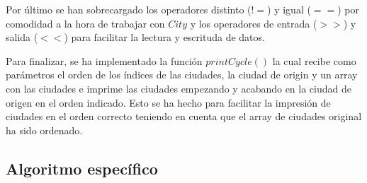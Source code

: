 \documentclass{article}
\begin{document}
Por último se han sobrecargado los operadores distinto ($!=$) y igual ($==$) por comodidad a la hora de trabajar con $City$ y los operadores de entrada ($>>$) y salida ($<<$) para facilitar la lectura y escrituda de datos.



Para finalizar, se ha implementado la función $printCycle()$ la cual recibe como parámetros el orden de los índices de las ciudades, la ciudad de origin y un array con las ciudades e imprime las ciudades empezando y acabando en la ciudad de origen en el orden indicado. Esto se ha hecho para facilitar la impresión de ciudades en el orden correcto teniendo en cuenta que el array de ciudades original ha sido ordenado.



\subsection{Algoritmo específico} 
\end{document}

